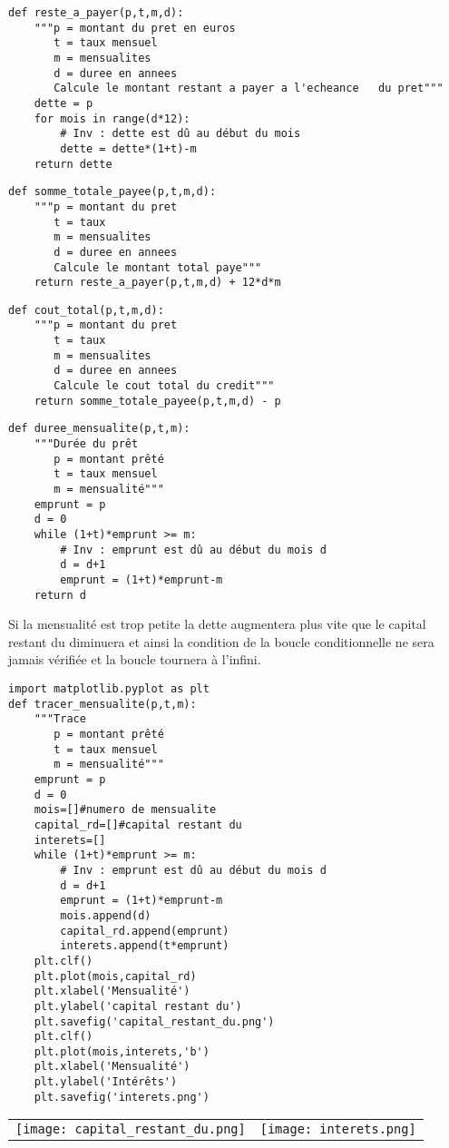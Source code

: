 \exer{}
\setcounter{numques}{0}

\question{}
\begin{lstlisting}
def reste_a_payer(p,t,m,d):
    """p = montant du pret en euros
       t = taux mensuel
       m = mensualites
       d = duree en annees
       Calcule le montant restant a payer a l'echeance   du pret"""
    dette = p
    for mois in range(d*12):
        # Inv : dette est dû au début du mois
        dette = dette*(1+t)-m
    return dette
 \end{lstlisting}  
    
\question{}    
 
 \begin{lstlisting}   
def somme_totale_payee(p,t,m,d):
    """p = montant du pret
       t = taux
       m = mensualites
       d = duree en annees
       Calcule le montant total paye"""
    return reste_a_payer(p,t,m,d) + 12*d*m
 \end{lstlisting}      
\question{}


\begin{lstlisting}
def cout_total(p,t,m,d):
    """p = montant du pret
       t = taux
       m = mensualites
       d = duree en annees
       Calcule le cout total du credit"""
    return somme_totale_payee(p,t,m,d) - p
\end{lstlisting}

\question{}

\begin{lstlisting}
def duree_mensualite(p,t,m):
    """Durée du prêt
       p = montant prêté
       t = taux mensuel
       m = mensualité"""
    emprunt = p
    d = 0
    while (1+t)*emprunt >= m:
        # Inv : emprunt est dû au début du mois d
        d = d+1
        emprunt = (1+t)*emprunt-m
    return d
\end{lstlisting}

\question{}

Si la mensualité est trop petite la dette augmentera plus vite que le capital restant du diminuera et ainsi la condition de la boucle conditionnelle ne sera jamais vérifiée et la boucle tournera à l'infini.

\question{}

\begin{lstlisting}
import matplotlib.pyplot as plt    
def tracer_mensualite(p,t,m):
    """Trace
       p = montant prêté
       t = taux mensuel
       m = mensualité"""
    emprunt = p
    d = 0
    mois=[]#numero de mensualite
    capital_rd=[]#capital restant du
    interets=[]
    while (1+t)*emprunt >= m:
        # Inv : emprunt est dû au début du mois d
        d = d+1
        emprunt = (1+t)*emprunt-m
        mois.append(d)
        capital_rd.append(emprunt)
        interets.append(t*emprunt)
    plt.clf()
    plt.plot(mois,capital_rd)
    plt.xlabel('Mensualité')
    plt.ylabel('capital restant du')
    plt.savefig('capital_restant_du.png')
    plt.clf()
    plt.plot(mois,interets,'b')
    plt.xlabel('Mensualité')
    plt.ylabel('Intérêts')
    plt.savefig('interets.png')
\end{lstlisting}

\begin{center}
\begin{tabular}{cc}
\texttt{[image: capital\_restant\_du.png]}
&
\texttt{[image: interets.png]}
\end{tabular}
\end{center}